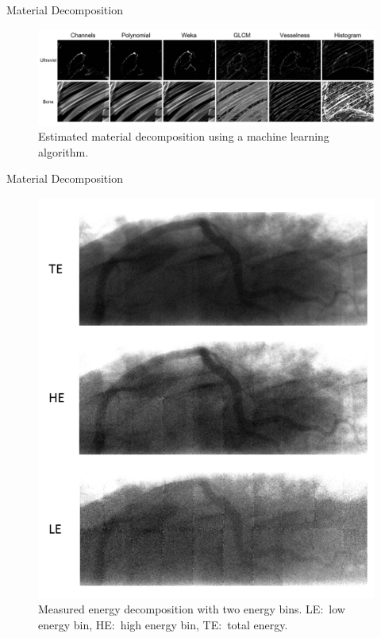 \begin{frame}[c]{Material Decomposition}
	\begin{figure}[htpb]
		\centering
		\includegraphics[height=0.55\textheight]{images/lu_material_decompositon2.png}
		\caption{Estimated material decomposition using a machine learning algorithm.}%
	\end{figure}
	\flushright{}
	\tiny
\end{frame}

\begin{frame}[t]{Material Decomposition}
	\vspace{-1cm}
	\begin{figure}[htpb]
		\centering
		\includegraphics[height=0.8\textheight]{images/mueller_material_decomposition1.png}
		\caption{Measured energy decomposition with two energy bins. LE:\ low energy bin, HE:\ high energy bin, TE:\ total energy.}%
	\end{figure}
	\flushright{}
	\tiny
\end{frame}

